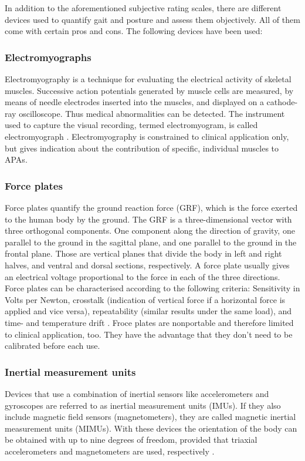 In addition to the aforementioned subjective rating scales, there are different devices used to quantify gait and posture and assess them objectively. All of them come with certain pros and cons. The following devices have been used:

\subsubsection{Electromyographs} Electromyography is a technique for evaluating the electrical activity of skeletal muscles. Successive action potentials generated by muscle cells are measured, by means of needle electrodes inserted into the muscles, and displayed on a cathode-ray oscilloscope. Thus medical abnormalities can be detected. The instrument used to capture the visual recording, termed electromyogram, is called electromyograph \cite{encyclopedia_britannica_electromyography_2014}. Electromyography is constrained to clinical application only, but gives indication about the contribution of specific, individual muscles to APAs.

\subsubsection{Force plates} Force plates quantify the ground reaction force (GRF), which is the force exerted to the human body by the ground. The GRF is a three-dimensional vector with three orthogonal components. One component along the direction of gravity, one parallel to the ground in the sagittal plane, and one parallel to the ground in the frontal plane. Those are vertical planes that divide the body in left and right halves, and ventral and dorsal sections, respectively. A force plate usually gives an electrical voltage proportional to the force in each of the three directions. Force plates can be characterised according to the following criteria: Sensitivity in Volts per Newton, crosstalk (indication of vertical force if a horizontal force is applied and vice versa), repeatability (similar results under the same load), and time- and temperature drift \cite{griffiths_principles_2006}. Froce plates are nonportable and therefore limited to clinical application, too. They have the advantage that they don't need to be calibrated before each use.

\subsubsection{Inertial measurement units} Devices that use a combination of inertial sensors like accelerometers and gyroscopes are referred to as inertial measurement units (IMUs). If they also include magnetic field sensors (magnetometers), they are called magnetic inertial measurement units (MIMUs). With these devices the orientation of the body can be obtained with up to nine degrees of freedom, provided that triaxial accelerometers and magnetometers are used, respectively \cite{olivares_vicente_signal_2013}.

